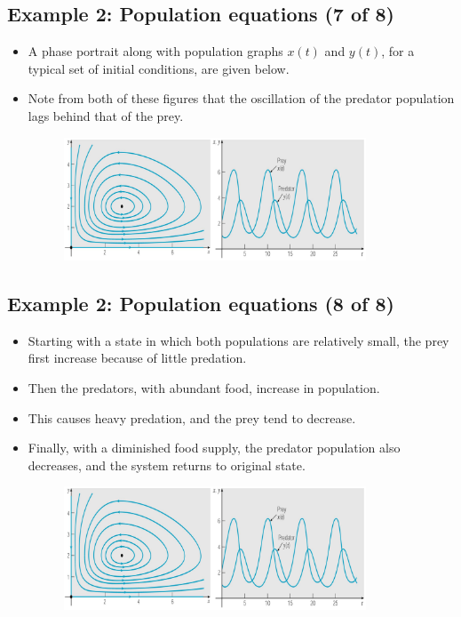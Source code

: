 \documentclass[11pt,a4paper]{article}
\begin{document}
	\subsection*{Example 2: Population equations (7 of 8)}
	\begin{itemize}
		\item A phase portrait along with population graphs $x(t)$ and $y(t)$, for a typical set of initial conditions, are given below.
		\item Note from both of these figures that the oscillation of the predator population lags behind that of the prey.
		\begin{figure}[H]
			\centering
			\includegraphics[width=0.85\textwidth]{figure/Lec17f7.PNG}
		\end{figure}
	\end{itemize}
	\subsection*{Example 2: Population equations (8 of 8)}
	\begin{itemize}
		\item Starting with a state in which both populations are relatively small, the prey first increase because of little predation.
		\item Then the predators, with abundant food, increase in population.
		\item This causes heavy predation, and the prey tend to decrease.
		\item Finally, with a diminished food supply, the predator population also decreases, and the system returns to original state.
		\begin{figure}[H]
			\centering
			\includegraphics[width=0.85\textwidth]{figure/Lec17f7.PNG}
		\end{figure}
	\end{itemize}
\end{document}
